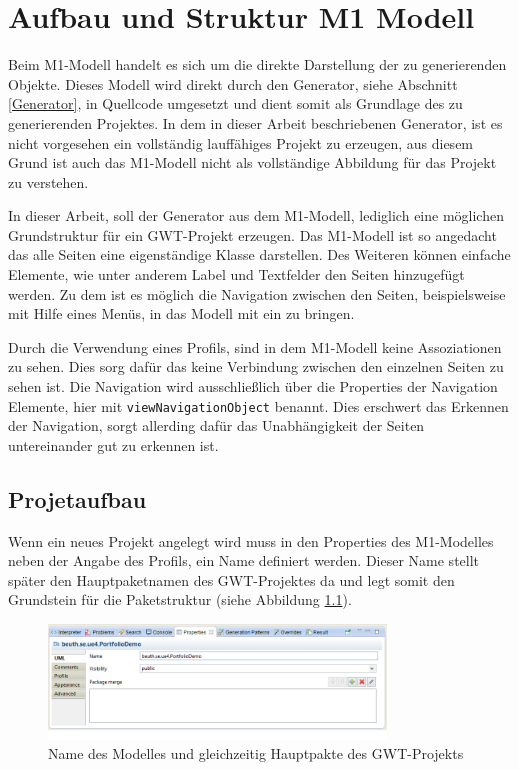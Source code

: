 \chapter{Aufbau und Struktur M1 Modell} \label{M1Modell}
Beim M1-Modell handelt es sich um die direkte Darstellung der zu generierenden
Objekte. Dieses Modell wird direkt durch den Generator, siehe Abschnitt
\ref{Generator}, in Quellcode umgesetzt und dient somit als Grundlage des
zu generierenden Projektes. In dem in dieser Arbeit beschriebenen Generator, ist
es nicht vorgesehen ein vollständig lauffähiges Projekt zu erzeugen, aus diesem
Grund ist auch das M1-Modell nicht als vollständige Abbildung für das Projekt zu
verstehen. 

In dieser Arbeit, soll der Generator aus dem M1-Modell, lediglich eine möglichen
Grundstruktur für ein GWT-Projekt erzeugen. Das M1-Modell ist so angedacht das
alle Seiten eine eigenständige Klasse darstellen. Des Weiteren können einfache
Elemente, wie unter anderem Label und Textfelder den Seiten hinzugefügt werden.
Zu dem ist es möglich die Navigation zwischen den Seiten, beispielsweise mit
Hilfe eines Menüs, in das Modell mit ein zu bringen. 

Durch die Verwendung eines Profils, sind in dem M1-Modell keine Assoziationen
zu sehen. Dies sorg dafür das keine Verbindung zwischen den einzelnen Seiten zu
sehen ist. Die Navigation wird ausschließlich über die Properties der
Navigation Elemente, hier mit \texttt{viewNavigationObject} benannt. Dies
erschwert das Erkennen der Navigation, sorgt allerding dafür das Unabhängigkeit
der Seiten untereinander gut zu erkennen ist.

\section{Projetaufbau}
Wenn ein neues Projekt angelegt wird muss in den Properties des M1-Modelles
neben der Angabe des Profils, ein Name definiert werden. Dieser Name stellt
später den Hauptpaketnamen des GWT-Projektes da und legt somit den Grundstein
für die Paketstruktur (siehe Abbildung \ref{Fig:mainpackage}).

\begin{figure}[htbp]
\begin{center}
\includegraphics[width=0.8\textwidth]{./img/ProjectPackage.png}
\caption{Name des Modelles und gleichzeitig Hauptpakte des
GWT-Projekts}\label{Fig:mainpackage}
\end{center}
\end{figure}

